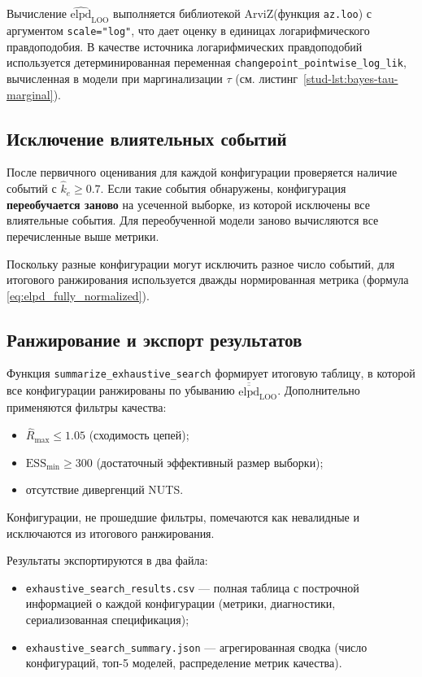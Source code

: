 \documentclass[14pt]{mmcs_article}
\begin{document}
	Вычисление $\widehat{\mathrm{elpd}}_{\mathrm{LOO}}$
	выполняется библиотекой ArviZ\linebreak (функция \texttt{az.loo}) с
	аргументом \texttt{scale="log"}, что дает оценку в единицах
	логарифмического правдоподобия. В качестве источника
	логарифмических правдоподобий используется детерминированная
	переменная \linebreak\texttt{changepoint\_pointwise\_log\_lik},
	вычисленная в модели при маргинализации $\tau$ (см.
	листинг~\ref{stud-lst:bayes-tau-marginal}).
	
	\subsection*{Исключение влиятельных событий}
	
	После первичного оценивания для каждой конфигурации
	проверяется наличие событий с $\hat{k}_e \geq 0.7$. Если
	такие события обнаружены, конфигурация \textbf{переобучается
		заново} на усеченной выборке, из которой исключены все
	влиятельные события. Для переобученной модели заново
	вычисляются все перечисленные выше метрики.
	
	Поскольку разные конфигурации могут исключить разное число
	событий, для итогового ранжирования используется дважды
	нормированная метрика (формула \ref{eq:elpd_fully_normalized}).
	
	
	\subsection*{Ранжирование и экспорт результатов}
	
	Функция \texttt{summarize\_exhaustive\_search} формирует
	итоговую таблицу, в которой все конфигурации ранжированы по
	убыванию $\overline{\overline{\mathrm{elpd}}}_{\mathrm{LOO}}$.
	Дополнительно применяются фильтры качества:
	\begin{itemize}
		\item $\hat{R}_{\max} \leq 1.05$ (сходимость цепей);
		\item $\mathrm{ESS}_{\min} \geq 300$ (достаточный
		эффективный размер выборки);
		\item отсутствие дивергенций NUTS.
	\end{itemize}
	Конфигурации, не прошедшие фильтры, помечаются как
	невалидные и исключаются из итогового ранжирования.
	
	Результаты экспортируются в два файла:
	\begin{itemize}
		\item \texttt{exhaustive\_search\_results.csv} — полная
		таблица с построчной информацией о каждой
		конфигурации (метрики, диагностики, сериализованная
		спецификация);
		\item \texttt{exhaustive\_search\_summary.json} —
		агрегированная сводка (число конфигураций, топ-5
		моделей, распределение метрик качества).
	\end{itemize}
	
\end{document}
